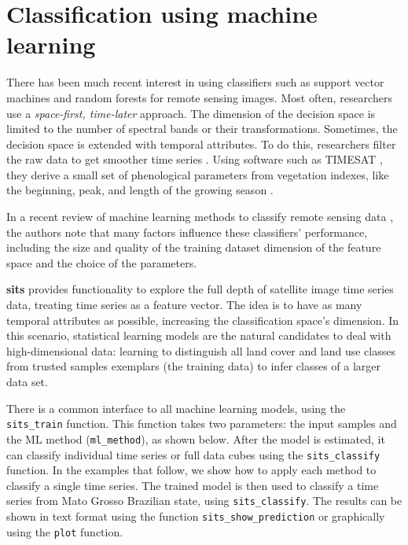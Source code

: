 \documentclass[a4paper,]{tufte-book}
\begin{document}
\hypertarget{classification-using-machine-learning}{%
\section{Classification using machine learning}\label{classification-using-machine-learning}}

There has been much recent interest in using classifiers such as support vector machines \citep{Mountrakis2011} and random forests \citep{Belgiu2016} for remote sensing images. Most often, researchers use a \emph{space-first, time-later} approach. The dimension of the decision space is limited to the number of spectral bands or their transformations. Sometimes, the decision space is extended with temporal attributes. To do this, researchers filter the raw data to get smoother time series \citep{Brown2013, Kastens2017}. Using software such as TIMESAT \citep{Jonsson2004}, they derive a small set of phenological parameters from vegetation indexes, like the beginning, peak, and length of the growing season \citep{Estel2015, Pelletier2016}.

In a recent review of machine learning methods to classify remote sensing data \citep{Maxwell2018}, the authors note that many factors influence these classifiers' performance, including the size and quality of the training dataset dimension of the feature space and the choice of the parameters.

\textbf{sits} provides functionality to explore the full depth of satellite image time series data, treating time series as a feature vector. The idea is to have as many temporal attributes as possible, increasing the classification space's dimension. In this scenario, statistical learning models are the natural candidates to deal with high-dimensional data: learning to distinguish all land cover and land use classes from trusted samples exemplars (the training data) to infer classes of a larger data set.

There is a common interface to all machine learning models, using the \texttt{sits\_train} function. This function takes two parameters: the input samples and the ML method (\texttt{ml\_method}), as shown below. After the model is estimated, it can classify individual time series or full data cubes using the \texttt{sits\_classify} function. In the examples that follow, we show how to apply each method to classify a single time series. The trained model is then used to classify a time series from Mato Grosso Brazilian state, using \texttt{sits\_classify}. The results can be shown in text format using the function \texttt{sits\_show\_prediction} or graphically using the \texttt{plot} function.
\end{document}
